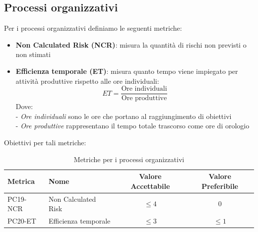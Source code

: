 \documentclass[a4paper,10pt]{article}
\begin{document}
\subsection{Processi organizzativi}
Per i processi organizzativi definiamo le seguenti metriche:
\begin{itemize}
    \item \textbf{Non Calculated Risk (NCR)}: misura la quantità di rischi non previsti o non stimati
    \item \textbf{Efficienza temporale (ET)}: misura quanto tempo viene impiegato per attività produttive rispetto alle ore individuali:
    \[
    ET = \frac{\text{Ore individuali}}{\text{Ore produttive}}
    \]
    Dove: \\
    - \textit{Ore individuali} sono le ore che portano al raggiungimento di obiettivi \\
    - \textit{Ore produttive} rappresentano il tempo totale trascorso come ore di orologio
\end{itemize}
Obiettivi per tali metriche:
\begin{table}[H]
\centering
\renewcommand{\arraystretch}{1.2}
\begin{tabular}{|l|l|c|c|}
\hline
\textbf{Metrica} & \textbf{Nome} & \textbf{Valore Accettabile} & \textbf{Valore Preferibile} \\
\hline
PC19-NCR & Non Calculated Risk & $\leq 4$ & 0 \\
PC20-ET  & Efficienza temporale  & $\leq 3$ & $\leq 1$ \\
\hline
\end{tabular}
\caption{Metriche per i processi organizzativi}
\label{tab:metriche-organizzativi}
\end{table}
\end{document}
